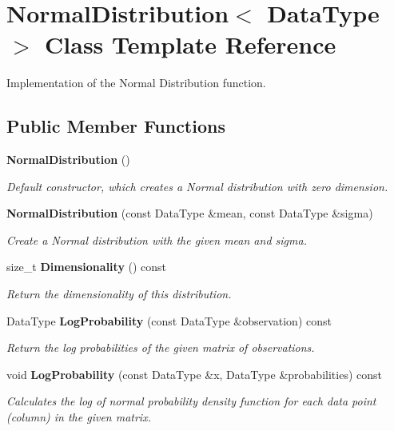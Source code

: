 \section{Normal\+Distribution$<$ Data\+Type $>$ Class Template Reference}
\label{classmlpack_1_1ann_1_1NormalDistribution}


Implementation of the Normal Distribution function.  


\subsection*{Public Member Functions}
\begin{DoxyCompactItemize}
\item 
\textbf{ Normal\+Distribution} ()
\begin{DoxyCompactList}\small\item\em Default constructor, which creates a Normal distribution with zero dimension. \end{DoxyCompactList}\item 
\textbf{ Normal\+Distribution} (const Data\+Type \&mean, const Data\+Type \&sigma)
\begin{DoxyCompactList}\small\item\em Create a Normal distribution with the given mean and sigma. \end{DoxyCompactList}\item 
size\+\_\+t \textbf{ Dimensionality} () const
\begin{DoxyCompactList}\small\item\em Return the dimensionality of this distribution. \end{DoxyCompactList}\item 
Data\+Type \textbf{ Log\+Probability} (const Data\+Type \&observation) const
\begin{DoxyCompactList}\small\item\em Return the log probabilities of the given matrix of observations. \end{DoxyCompactList}\item 
void \textbf{ Log\+Probability} (const Data\+Type \&x, Data\+Type \&probabilities) const
\begin{DoxyCompactList}\small\item\em Calculates the log of normal probability density function for each data point (column) in the given matrix. \end{DoxyCompactList}\item 

\end{DoxyCompactItemize}
